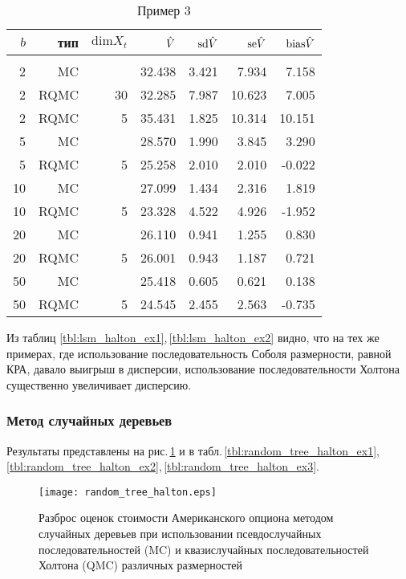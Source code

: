 \begin{table}
    \centering
    \caption{Пример 3}\label{tbl:lsm_halton_ex3}
    \begin{tabular}{rrrrrrr}
        $b$&тип&$\mathrm{dim} X_t$&$\hat{V}$&$\mathrm{sd}\hat{V}$&$\mathrm{se}\hat{V}$&$\mathrm{bias}\hat{V}$\\[3pt]\hline\\[-8pt]
        2&MC&&32.438&3.421&7.934&7.158\\
        2&RQMC&30&32.285&7.987&10.623&7.005\\
        2&RQMC&5&35.431&1.825&10.314&10.151\\[3pt]
        5&MC&&28.570&1.990&3.845&3.290\\
        5&RQMC&5&25.258&2.010&2.010&-0.022\\[3pt]
        10&MC&&27.099&1.434&2.316&1.819\\
        10&RQMC&5&23.328&4.522&4.926&-1.952\\[3pt]
        20&MC&&26.110&0.941&1.255&0.830\\
        20&RQMC&5&26.001&0.943&1.187&0.721\\[3pt]
        50&MC&&25.418&0.605&0.621&0.138\\
        50&RQMC&5&24.545&2.455&2.563&-0.735\\[3pt]
    \end{tabular}
\end{table}

Из таблиц \ref{tbl:lsm_halton_ex1},\,\ref{tbl:lsm_halton_ex2} видно, что на тех же примерах, где использование последовательность Соболя размерности, равной КРА, давало выигрыш в дисперсии, использование последовательности Холтона существенно увеличивает дисперсию. %


\subsubsection{Метод случайных деревьев} %
\label{ssub:results:qmc_to_classical:halton:random_tree}

Результаты представлены на рис.\,\ref{fig:random_tree_halton} и в табл.\,\ref{tbl:random_tree_halton_ex1},\,\ref{tbl:random_tree_halton_ex2},\,\ref{tbl:random_tree_halton_ex3}.

\begin{figure}[p]
    \centering
    \texttt{[image: random\_tree\_halton.eps]}
    \caption{Разброс оценок стоимости Американского опциона методом случайных деревьев при использовании псевдослучайных последовательностей (MC) и квазислучайных последовательностей Холтона (QMC) различных размерностей}
    \label{fig:random_tree_halton}
\end{figure}

